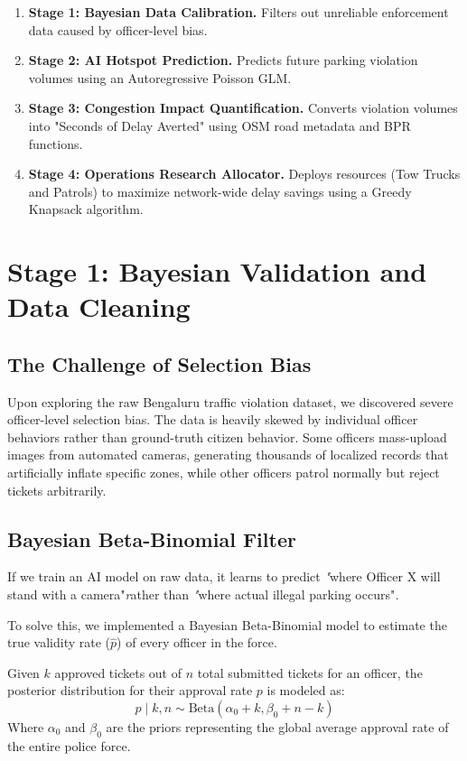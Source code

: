 \documentclass[12pt,a4paper]{article}
\begin{document}
\begin{enumerate}
    \item \textbf{Stage 1: Bayesian Data Calibration.} Filters out unreliable enforcement data caused by officer-level bias.
    \item \textbf{Stage 2: AI Hotspot Prediction.} Predicts future parking violation volumes using an Autoregressive Poisson GLM.
    \item \textbf{Stage 3: Congestion Impact Quantification.} Converts violation volumes into "Seconds of Delay Averted" using OSM road metadata and BPR functions.
    \item \textbf{Stage 4: Operations Research Allocator.} Deploys resources (Tow Trucks and Patrols) to maximize network-wide delay savings using a Greedy Knapsack algorithm.
\end{enumerate}

\section{Stage 1: Bayesian Validation and Data Cleaning}

\subsection{The Challenge of Selection Bias}
Upon exploring the raw Bengaluru traffic violation dataset, we discovered severe officer-level selection bias. The data is heavily skewed by individual officer behaviors rather than ground-truth citizen behavior. Some officers mass-upload images from automated cameras, generating thousands of localized records that artificially inflate specific zones, while other officers patrol normally but reject tickets arbitrarily.

\subsection{Bayesian Beta-Binomial Filter}
If we train an AI model on raw data, it learns to predict \textit"where Officer X will stand with a camera"\textit rather than \textit"where actual illegal parking occurs"\textit.

To solve this, we implemented a Bayesian Beta-Binomial model to estimate the true validity rate ($\hat{p}$) of every officer in the force. 

Given $k$ approved tickets out of $n$ total submitted tickets for an officer, the posterior distribution for their approval rate $p$ is modeled as:
\begin{equation}
    p \mid k, n \sim \text{Beta}(\alpha_0 + k, \beta_0 + n - k)
\end{equation}
Where $\alpha_0$ and $\beta_0$ are the priors representing the global average approval rate of the entire police force. 
\end{document}
